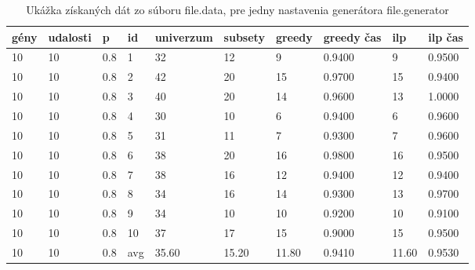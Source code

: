 \begin{table}[!htb]
\label{tab:data}
\begin{center}
\begin{tabular}{llllllllll}
gény&udalosti&p&id&univerzum&subsety&greedy&greedy čas&ilp&ilp čas\\
\hline
10&10&0.8&1&32&12&9&0.9400&9&0.9500\\
10&10&0.8&2&42&20&15&0.9700&15&0.9400\\
10&10&0.8&3&40&20&14&0.9600&13&1.0000\\
10&10&0.8&4&30&10&6&0.9400&6&0.9600\\
10&10&0.8&5&31&11&7&0.9300&7&0.9600\\
10&10&0.8&6&38&20&16&0.9800&16&0.9500\\
10&10&0.8&7&38&16&12&0.9400&12&0.9400\\
10&10&0.8&8&34&16&14&0.9300&13&0.9700\\
10&10&0.8&9&34&10&10&0.9200&10&0.9100\\
10&10&0.8&10&37&17&15&0.9000&15&0.9500\\
10&10&0.8&avg&35.60&15.20&11.80&0.9410&11.60&0.9530\\
\end{tabular}
\end{center}
\caption{Ukážka získaných dát zo súboru file.data, pre jedny nastavenia generátora file.generator}
\end{table}